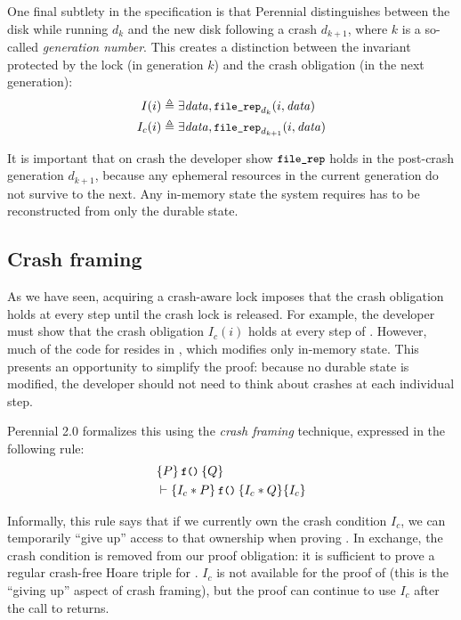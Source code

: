 One final subtlety in the specification is that Perennial distinguishes between
the disk while running $d_{k}$ and the new disk following a crash $d_{k+1}$,
where $k$ is a so-called \emph{generation number}. This creates a distinction
between the invariant protected by the lock (in generation $k$) and the crash
obligation (in the next generation):
\begin{align*}
  I(i) &\triangleq \exists \mathit{data}, \cc{file_rep}_{d_{k}}(i, \mathit{data}) \\
  I_c(i) &\triangleq \exists \mathit{data}, \cc{file_rep}_{d_{k+1}}(i, \mathit{data})
\end{align*}

It is important that on crash the developer show $\cc{file_rep}$ holds in the
post-crash generation $d_{k+1}$, because any ephemeral resources in the current
generation do not survive to the next. Any in-memory state the system requires
has to be reconstructed from only the durable state.



\subsection{Crash framing}
\label{s:design:crashframe}

As we have seen, acquiring a crash-aware lock imposes that the crash obligation holds at
every step until the crash lock is released.  For example, the developer must
show that the crash obligation $I_c(i)$
holds at every step of .  However, much of the
code for  resides in ,
which modifies only in-memory state.  This presents an opportunity to
simplify the proof: because no durable state is modified, the developer
should not need to think about crashes at each individual step.

Perennial 2.0 formalizes this using the \emph{crash framing} technique, expressed in the
following rule:
%
\begin{align*}
&\hoare{P}{\cc{f()}}{Q} \\
&\vdash \hoareC{I_c\sep P}{\cc{f()}}{I_c\sep Q}{I_c}
\end{align*}

Informally, this rule says that if we currently own the crash condition $I_c$, we can temporarily ``give up'' access to that ownership when proving .
In exchange, the crash condition is removed from our proof obligation: it is sufficient to prove a regular crash-free Hoare triple for .
$I_c$ is not available for the proof of  (this is the ``giving up'' aspect of crash framing),
but the proof can continue to use $I_{c}$ after the call to  returns.

